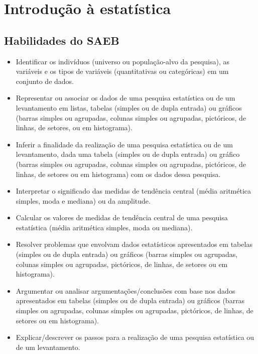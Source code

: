


\chapter{Introdução à estatística}

\section*{Habilidades do SAEB}

\begin{itemize}
\item Identificar os indivíduos (universo ou
população-alvo da pesquisa), as variáveis e os tipos de variáveis
(quantitativas ou categóricas) em um conjunto de dados.
\item
  Representar ou associar os dados de uma pesquisa estatística ou de um
  levantamento em listas, tabelas (simples ou de dupla entrada) ou
  gráficos (barras simples ou agrupadas, colunas simples ou agrupadas,
  pictóricos, de linhas, de setores, ou em histograma).
\item
  Inferir a finalidade da realização de uma pesquisa estatística ou de
  um levantamento, dada uma tabela (simples ou de dupla entrada) ou
  gráfico (barras simples ou agrupadas, colunas simples ou agrupadas,
  pictóricos, de linhas, de setores ou em histograma) com os dados dessa
  pesquisa.
\item
  Interpretar o significado das medidas de tendência central (média
  aritmética simples, moda e mediana) ou da amplitude.
\item
  Calcular os valores de medidas de tendência central de uma pesquisa
  estatística (média aritmética simples, moda ou mediana).
\item
  Resolver problemas que envolvam dados estatísticos apresentados em
  tabelas (simples ou de dupla entrada) ou gráficos (barras simples ou
  agrupadas, colunas simples ou agrupadas, pictóricos, de linhas, de
  setores ou em histograma).
\item
  Argumentar ou analisar argumentações/conclusões com base nos dados
  apresentados em tabelas (simples ou de dupla entrada) ou gráficos
  (barras simples ou agrupadas, colunas simples ou agrupadas,
  pictóricos, de linhas, de setores ou em histograma).
\item
  Explicar/descrever os passos para a realização de uma pesquisa
  estatística ou de um levantamento.
\end{itemize}

